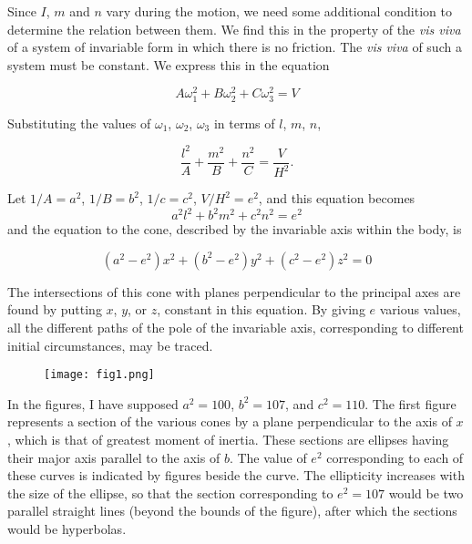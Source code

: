 \documentclass[12pt]{article}
\begin{document}
Since $I$, $m$ and $n$ vary during the motion, we need some additional
condition to determine the relation between them.  We find this in the
property of the \emph{vis viva} of a system of invariable form in
which there is no friction.  The \emph{vis viva} of such a system must
be constant.  We express this in the equation

\begin{equation}
A\omega_1^2 + B\omega_2^2 + C\omega_3^2 = V
\end{equation}

Substituting the values of $\omega_1$, $\omega_2$, $\omega_3$ in terms
of $l$, $m$, $n$,

\begin{displaymath}
\frac{l^2}{A} + \frac{m^2}{B} + \frac{n^2}{C} = \frac{V}{H^2}.
\end{displaymath}

Let $1/A = a^2$, $1/B = b^2$, $1/c = c^2$, $V/H^2 = e^2$, and this
equation becomes
%
\begin{equation}
a^2l^2 + b^2m^2 + c^2n^2 = e^2
\end{equation}
%
and the equation to the cone, described by the invariable axis within
the body, is

\begin{equation}
(a^2 - e^2) x^2 + (b^2 - e^2) y^2 + (c^2 - e^2) z^2 = 0 
\end{equation}

The intersections of this cone with planes perpendicular to the
principal axes are found by putting $x$, $y$, or $z$, constant in this
equation.  By giving $e$ various values, all the different paths of
the pole of the invariable axis, corresponding to different initial
circumstances, may be traced.

\begin{figure}
\texttt{[image: fig1.png]}
\caption{}
\end{figure}

\footnotemark[1]In the figures, I have supposed $a^2 = 100$, $b^2=
107$, and $c^2= 110$.  The first figure represents a section of the
various cones by a plane perpendicular to the axis of $x$, which is
that of greatest moment of inertia.  These sections are ellipses
having their major axis parallel to the axis of $b$.  The value of
$e^2$ corresponding to each of these curves is indicated by figures
beside the curve.  The ellipticity increases with the size of the
ellipse, so that the section corresponding to $e^2 = 107$ would be two
parallel straight lines (beyond the bounds of the figure), after which
the sections would be hyperbolas.
\end{document}
